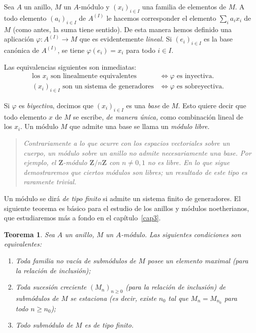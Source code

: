 \documentclass[bibtotoc,leqno,spanish]{amsbook}
\newcommand{\ZZ}{\mathbf{Z}}
\renewcommand{\to}[1][]{\xrightarrow{#1}}
\numberwithin{equation}{section}
\newenvironment{comm}%
	{\begin{quotation}\itshape}
	{\end{quotation}}
\theoremstyle{note}
\theoremstyle{note}
\newtheorem{theorem}{Teorema}
\theoremstyle{rem}
\numberwithin{theorem}{section}
\numberwithin{proposition}{section}
\numberwithin{definition}{section}
\numberwithin{lemma}{section}
\numberwithin{corollary}{section}
\numberwithin{example}{section}
\numberwithin{footnote}{section}%
\begin{document}
Sea $A$ un anillo, $M$ un $A$-m\'odulo y $(x_{i})_{i\in I}$ una familia de elementos
de $M$. A todo elemento
$(a_{i})_{i\in I}$ de $A^{(I)}$ le hacemos corresponder el elemento $\sum_{i}a_{i}x_{i}$
de $M$ (como antes, la
suma tiene sentido). De esta manera hemos definido una aplicaci\'on
$\varphi:A^{(I)}\to M$ que es evidentemente
{\em lineal.} Si $(e_{i})_{i\in I}$ es la base can\'onica de $A^{(I)}$, se
tiene $\varphi(e_{i}) = x_{i}$ para todo
$i\in I$.

Las equivalencias siguientes son inmediatas:
\begin{align}
\text{los $x_{i}$ son linealmente equivalentes} &\iff \text{$\varphi$ es inyectiva.}\\
\text{$(x_{i})_{i\in I}$ son un sistema de generadores} &\iff \text{$\varphi$ es sobreyectiva.}
\end{align}

Si $\varphi$ es {\em biyectiva}, decimos que $(x_{i})_{i\in I}$ es una {\em base}
de $M$. Esto quiere decir que
todo elemento $x$ de $M$ se escribe, {\em de manera \'unica,} como combinaci\'on lineal
de los $x_{i}$. Un m\'odulo
$M$ que admite una base se llama un {\em m\'odulo libre.}

\begin{comm}
Contrariamente a lo que ocurre con los espacios vectoriales sobre un cuerpo, un
m\'odulo sobre un
anillo no admite necesariamente una base. Por ejemplo, el $\ZZ$-m\'odulo $\ZZ/n\ZZ$
con $n\neq 0,1$
no es libre.
En lo que sigue demostraremos que ciertos m\'odulos son libres; un resultado de este
tipo es raramente trivial.
\end{comm}

Un m\'odulo se dir\'a {\em de tipo finito} si admite un sistema finito de
generadores. El siguiente teorema
es b\'asico para el estudio de los anillos y m\'odulos noetherianos, que estudiaremos
m\'as a fondo en el cap\'itulo~\ref{cap3}.

\begin{theorem}\label{teo1.4.1}
Sea $A$ un anillo, $M$ un $A$-m\'odulo. Las siguientes condiciones son equivalentes:
\begin{enumerate}
\item Toda familia no vac\'ia de subm\'odulos de $M$ posee un elemento maximal
(para la relaci\'on de inclusi\'on);
\item Toda sucesi\'on creciente $(M_{n})_{n\geq 0}$ (para la relaci\'on de inclusi\'on)
de subm\'odulos
de $M$ se estaciona (es decir, existe $n_{0}$ tal que $M_{n} = M_{n_{0}}$ para
todo $n\geq n_{0}$);
\item Todo subm\'odulo de $M$ es de tipo finito.
\end{enumerate}
\end{theorem}
\end{document}
